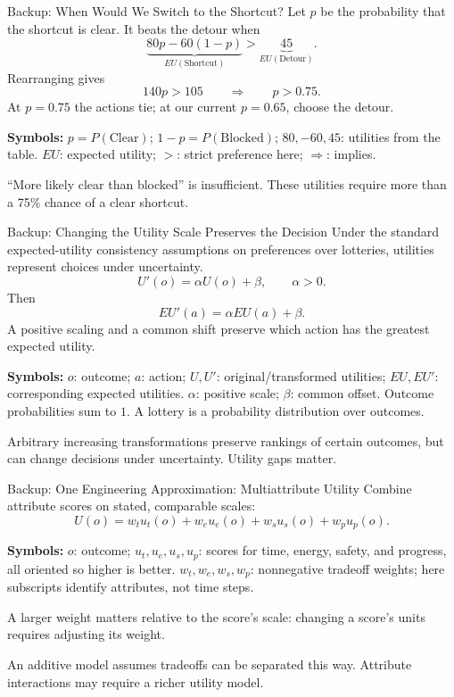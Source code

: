 \documentclass[aspectratio=169,10pt]{beamer}
\newcommand{\equationlegend}[1]{%
  \par\smallskip
  \begingroup
    \setlength{\fboxsep}{4pt}%
    \noindent\colorbox{DeckSoft}{%
      \parbox{\dimexpr\linewidth-2\fboxsep\relax}{%
        \footnotesize\textbf{Symbols:} #1%
      }%
    }\par
  \endgroup
  \smallskip
}
\begin{document}
\begin{frame}[t]{Backup: When Would We Switch to the Shortcut?}
  \small
  Let $p$ be the probability that the shortcut is clear. It beats the detour when
  \[
    \underbrace{80p-60(1-p)}_{EU(\text{Shortcut})}>\underbrace{45}_{EU(\text{Detour})}.
  \]
  Rearranging gives
  \[
    140p>105\qquad\Longrightarrow\qquad p>0.75.
  \]
  At $p=0.75$ the actions tie; at our current $p=0.65$, choose the detour.
  \equationlegend{$p=P(\text{Clear})$; $1-p=P(\text{Blocked})$; $80,-60,45$: utilities from the table. $EU$: expected utility; $>$: strict preference here; $\Longrightarrow$: implies.}
  \begin{keyidea}
    ``More likely clear than blocked'' is insufficient. These utilities require more than a 75\% chance of a clear shortcut.
  \end{keyidea}
\end{frame}

\begin{frame}[t]{Backup: Changing the Utility Scale Preserves the Decision}
  \small
  Under the standard expected-utility consistency assumptions on preferences over lotteries, utilities represent choices under uncertainty.
  \[
    U'(o)=\alpha U(o)+\beta,\qquad \alpha>0.
  \]
  Then
  \[
    EU'(a)=\alpha EU(a)+\beta.
  \]
  A positive scaling and a common shift preserve which action has the greatest expected utility.
  \equationlegend{$o$: outcome; $a$: action; $U,U'$: original/transformed utilities; $EU,EU'$: corresponding expected utilities. $\alpha$: positive scale; $\beta$: common offset. Outcome probabilities sum to $1$. A lottery is a probability distribution over outcomes.}
  \begin{keyidea}
    Arbitrary increasing transformations preserve rankings of certain outcomes, but can change decisions under uncertainty. Utility gaps matter.
  \end{keyidea}
\end{frame}

\begin{frame}[t]{Backup: One Engineering Approximation: Multiattribute Utility}
  \small
  Combine attribute scores on stated, comparable scales:
  \[
    U(o)=w_tu_t(o)+w_eu_e(o)+w_su_s(o)+w_pu_p(o).
  \]
  \equationlegend{$o$: outcome; $u_t,u_e,u_s,u_p$: scores for time, energy, safety, and progress, all oriented so higher is better. $w_t,w_e,w_s,w_p$: nonnegative tradeoff weights; here subscripts identify attributes, not time steps.}
  A larger weight matters relative to the score's scale: changing a score's units requires adjusting its weight.
  \begin{keyidea}
    An additive model assumes tradeoffs can be separated this way. Attribute interactions may require a richer utility model.
  \end{keyidea}
\end{frame}
\end{document}
